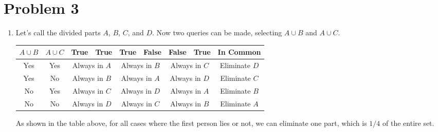 \documentclass[10pt]{article}
\begin{document}
\section*{Problem 3}
\begin{enumerate}[leftmargin=*]
    \item Let's call the divided parts $A$, $B$, $C$, and $D$.
    Now two queries can be made, selecting $A \cup B$ and $A \cup C$.
    \begin{table}[H]
        \centering
        \renewcommand{\arraystretch}{1.5}
        \begin{tabular}{|cc|cc|cc|cc|c|}
            \hline
            $A \cup B$ & $A \cup C$ & True & True & True & False & False & True & In Common\\ \hline
            Yes & Yes  & \multicolumn{2}{|c|}{Always in $A$} & \multicolumn{2}{|c|}{Always in $B$} & \multicolumn{2}{|c|}{Always in $C$} & Eliminate $D$ \\
            Yes & No & \multicolumn{2}{|c|}{Always in $B$} & \multicolumn{2}{|c|}{Always in $A$} & \multicolumn{2}{|c|}{Always in $D$} & Eliminate $C$ \\
            No & Yes & \multicolumn{2}{|c|}{Always in $C$} & \multicolumn{2}{|c|}{Always in $D$} & \multicolumn{2}{|c|}{Always in $A$} & Eliminate $B$ \\
            No & No & \multicolumn{2}{|c|}{Always in $D$} & \multicolumn{2}{|c|}{Always in $C$} & \multicolumn{2}{|c|}{Always in $B$} & Eliminate $A$ \\
            \hline
        \end{tabular}
    \end{table}
    As shown in the table above, for all cases where the first person lies or not, we can eliminate one part, which is $1/4$ of the entire set.


\end{enumerate}
\end{document}
